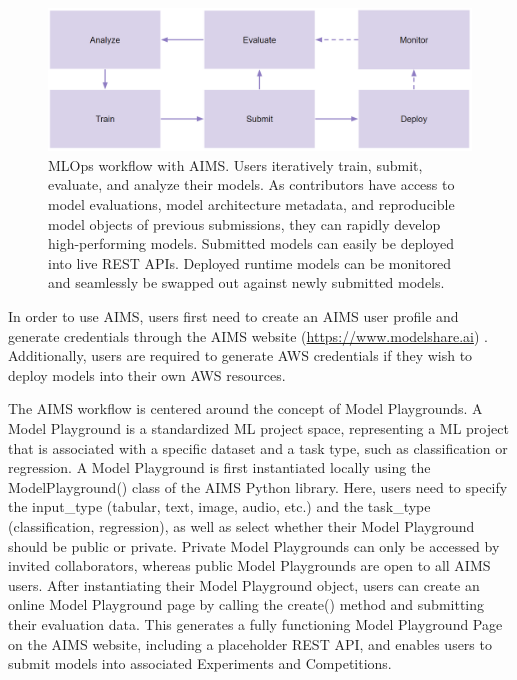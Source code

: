 \begin{figure}
  \centering
  \includegraphics[width=1\textwidth]{figures/fig_aims_workflow.png}
  \caption{MLOps workflow with AIMS. Users iteratively train, submit, evaluate, and analyze their models. As contributors have access to model evaluations, model architecture metadata, and reproducible model objects of previous submissions, they can rapidly develop high-performing models. Submitted models can easily be deployed into live REST APIs. Deployed runtime models can be monitored and seamlessly be swapped out against newly submitted models.}
  \label{fig:fig_aims_workflow}
\end{figure}


In order to use AIMS, users first need to create an AIMS user profile and generate credentials through the AIMS website (\href{https://www.modelshare.ai}{https://www.modelshare.ai}) \citep{noauthor_model_nodate}. Additionally, users are required to generate AWS credentials if they wish to deploy models into their own AWS resources. 

The AIMS workflow is centered around the concept of Model Playgrounds. A Model Playground is a standardized ML project space, representing a ML project that is associated with a specific dataset and a task type, such as classification or regression. A Model Playground is first instantiated locally using the ModelPlayground() class of the AIMS Python library. Here, users need to specify the input\_type (tabular, text, image, audio, etc.) and the task\_type (classification, regression), as well as select whether their Model Playground should be public or private. Private Model Playgrounds can only be accessed by invited collaborators, whereas public Model Playgrounds are open to all AIMS users. After instantiating their Model Playground object, users can create an online Model Playground page by calling the create() method and submitting their evaluation data. This generates a fully functioning Model Playground Page on the AIMS website, including a placeholder REST API, and enables users to submit models into associated Experiments and Competitions. 

